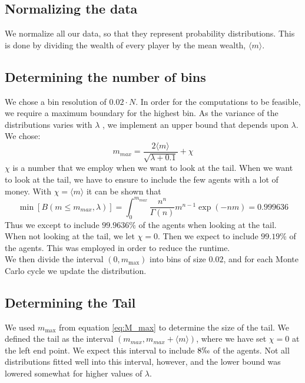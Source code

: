 \documentclass[a4paper, 10pt]{article}
\begin{document}
\subsection{Normalizing the data}
We normalize all our data, so that they represent probability distributions. This is done by dividing the wealth of every player by the mean wealth, $\langle m \rangle$. 
\subsection{Determining the number of bins}
We chose a bin resolution of $0.02 \cdot N$. In order for the computations to be feasible, we require a maximum boundary for the highest bin. As the variance of the distributions varies with $\lambda$ , we implement an upper bound that depends upon $\lambda$. We chose:
\begin{equation}\label{eq:M_max}
m_{max} = \frac{2\langle m \rangle}{\sqrt{\lambda + 0.1}} + \chi
\end{equation}
$\chi$ is a number that we employ when we want to look at the tail. When we want to look at the tail, we have to ensure to include the few agents with a lot of money. With $\chi = \langle m \rangle$ it can be shown that
\begin{equation}
\min[B(m\leq m_{max},\lambda)] = \int_0^{m_{max}} \frac{n^n}{\Gamma(n)}m^{n-1}\exp(-nm) = 0.999636 
\end{equation}
Thus we except to include $99.9636 \%$ of the agents when looking at the tail. \\
\linebreak
When not looking at the tail, we let $\chi = 0$. Then we expect to include $99.19\%$ of the agents. This was employed in order to reduce the runtime. \\
\linebreak
We then divide the interval $(0,m_{\max})$ into bins of size $0.02$, and for each Monte Carlo cycle we update the distribution.
\subsection{Determining the Tail}\label{Tail_section}
We used $m_{\max}$ from equation \ref{eq:M_max} to determine the size of the tail. We defined the tail as the interval $(m_{max},m_{max}+\langle m \rangle)$, where we have set $\chi=0$ at the left end point. We expect this interval to include $8 \permil$ of the agents. Not all distributions fitted well into this interval, however, and the lower bound was lowered somewhat for higher values of $\lambda$.
\end{document}
